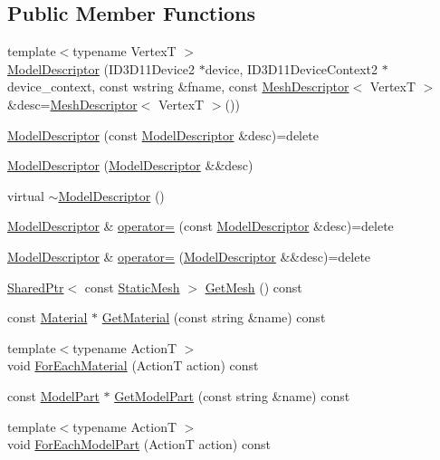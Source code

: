 \subsection*{Public Member Functions}
\begin{DoxyCompactItemize}
\item 
{\footnotesize template$<$typename VertexT $>$ }\\\hyperlink{classmage_1_1_model_descriptor_a1ae1d85907be96350cef77e6a4ba4fb9}{Model\+Descriptor} (I\+D3\+D11\+Device2 $\ast$device, I\+D3\+D11\+Device\+Context2 $\ast$device\+\_\+context, const wstring \&fname, const \hyperlink{structmage_1_1_mesh_descriptor}{Mesh\+Descriptor}$<$ VertexT $>$ \&desc=\hyperlink{structmage_1_1_mesh_descriptor}{Mesh\+Descriptor}$<$ VertexT $>$())
\item 
\hyperlink{classmage_1_1_model_descriptor_af44185efc20e10ede762d29bc454c5f3}{Model\+Descriptor} (const \hyperlink{classmage_1_1_model_descriptor}{Model\+Descriptor} \&desc)=delete
\item 
\hyperlink{classmage_1_1_model_descriptor_af5ece586e2a8404cc29e703885531e72}{Model\+Descriptor} (\hyperlink{classmage_1_1_model_descriptor}{Model\+Descriptor} \&\&desc)
\item 
virtual \hyperlink{classmage_1_1_model_descriptor_aae13cf050ee7f9283d91282c04f62df1}{$\sim$\+Model\+Descriptor} ()
\item 
\hyperlink{classmage_1_1_model_descriptor}{Model\+Descriptor} \& \hyperlink{classmage_1_1_model_descriptor_a734b17224719896921e9f6252ee88483}{operator=} (const \hyperlink{classmage_1_1_model_descriptor}{Model\+Descriptor} \&desc)=delete
\item 
\hyperlink{classmage_1_1_model_descriptor}{Model\+Descriptor} \& \hyperlink{classmage_1_1_model_descriptor_ae2ae685569c0ae534d9f0b5622a807d0}{operator=} (\hyperlink{classmage_1_1_model_descriptor}{Model\+Descriptor} \&\&desc)=delete
\item 
\hyperlink{namespacemage_a1e01ae66713838a7a67d30e44c67703e}{Shared\+Ptr}$<$ const \hyperlink{classmage_1_1_static_mesh}{Static\+Mesh} $>$ \hyperlink{classmage_1_1_model_descriptor_a579724811ea4577c039cd1e7655c70fe}{Get\+Mesh} () const
\item 
const \hyperlink{structmage_1_1_material}{Material} $\ast$ \hyperlink{classmage_1_1_model_descriptor_a689fa5039df71c630ec56db378214026}{Get\+Material} (const string \&name) const
\item 
{\footnotesize template$<$typename ActionT $>$ }\\void \hyperlink{classmage_1_1_model_descriptor_ac4723e18238b0d6ac3c54168b8e9a09f}{For\+Each\+Material} (ActionT action) const
\item 
const \hyperlink{structmage_1_1_model_part}{Model\+Part} $\ast$ \hyperlink{classmage_1_1_model_descriptor_af0913a998ec50055e3079c2b4ad6ad2e}{Get\+Model\+Part} (const string \&name) const
\item 
{\footnotesize template$<$typename ActionT $>$ }\\void \hyperlink{classmage_1_1_model_descriptor_a1d61699788385cf29726fac0067bcb5c}{For\+Each\+Model\+Part} (ActionT action) const
\end{DoxyCompactItemize}
